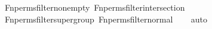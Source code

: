 \begin{isabellebody}
\ \ \ \ \ \ \ \ Fn{\isacharunderscore}{\kern0pt}perms{\isacharunderscore}{\kern0pt}filter{\isacharunderscore}{\kern0pt}nonempty\ Fn{\isacharunderscore}{\kern0pt}perms{\isacharunderscore}{\kern0pt}filter{\isacharunderscore}{\kern0pt}intersection\ \ \isanewline
\ \ \ \ \ \ \ \ Fn{\isacharunderscore}{\kern0pt}perms{\isacharunderscore}{\kern0pt}filter{\isacharunderscore}{\kern0pt}supergroup\ Fn{\isacharunderscore}{\kern0pt}perms{\isacharunderscore}{\kern0pt}filter{\isacharunderscore}{\kern0pt}normal\isanewline
\ \ \isamarkupfalse%
\ auto%
\endisatagproof
{\isafoldproof}%
%
\isadelimproof
\isanewline
%
\endisadelimproof
\isanewline
{}\isamarkupfalse%
\isanewline
%
\isadelimtheory
%
\endisadelimtheory
%
\isatagtheory
{}\isamarkupfalse%
%
\endisatagtheory
{\isafoldtheory}%
%
\isadelimtheory
%
\endisadelimtheory
%
\end{isabellebody}%
\endinput
